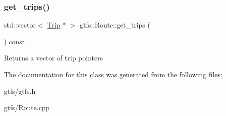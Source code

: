 \subsubsection{\texorpdfstring{get\+\_\+trips()}{get\_trips()}}
{\footnotesize\ttfamily std\+::vector$<$ \hyperlink{classgtfs_1_1Trip}{Trip} $\ast$ $>$ gtfs\+::\+Route\+::get\+\_\+trips (\begin{DoxyParamCaption}{ }\end{DoxyParamCaption}) const}

\begin{DoxyReturn}{Returns}
a vector of trip pointers 
\end{DoxyReturn}


The documentation for this class was generated from the following files\+:\begin{DoxyCompactItemize}
\item 
gtfs/gtfs.\+h\item 
gtfs/Route.\+cpp\end{DoxyCompactItemize}
